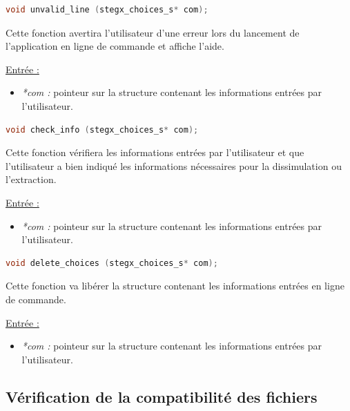 \documentclass[11pt]{article}
\begin{document}
\begin{lstlisting}[language=c]
void unvalid_line (stegx_choices_s* com);
\end{lstlisting}

Cette fonction avertira l'utilisateur d'une erreur lors du lancement 
de l'application en ligne de commande et affiche l'aide. \newline

\underline{Entrée :} 
\begin{itemize}
\item \textit{*com :} pointeur sur la structure contenant les informations 
entrées par l'utilisateur. 
\newline 
\end{itemize}

\begin{lstlisting}[language=c]
void check_info (stegx_choices_s* com);
\end{lstlisting}

Cette fonction vérifiera les informations entrées par l'utilisateur et 
que l'utilisateur a bien indiqué les informations nécessaires pour 
la dissimulation ou l'extraction. \newline

\underline{Entrée :} 
\begin{itemize}
\item \textit{*com :} pointeur sur la structure contenant les informations 
entrées par l'utilisateur. 
\newline 
\end{itemize}

\begin{lstlisting}[language=c]
void delete_choices (stegx_choices_s* com);
\end{lstlisting}

Cette fonction va libérer la structure contenant les informations entrées 
en ligne de commande. \newline

\underline{Entrée :} 
\begin{itemize}
\item \textit{*com :} pointeur sur la structure contenant les informations 
entrées par l'utilisateur. 
\newline 
\end{itemize}

\subsection{Vérification de la compatibilité des fichiers}
\end{document}
